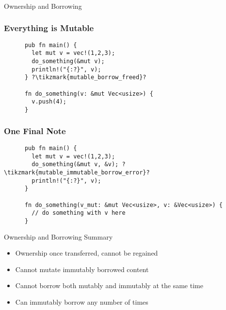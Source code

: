 \begin{section}{Ownership and Borrowing}
  \begin{frame}[fragile]
    \frametitle{Everything is Mutable}
    \begin{verbatim}
      pub fn main() {
        let mut v = vec!(1,2,3);
        do_something(&mut v);
        println!("{:?}", v);
      } ?\tikzmark{mutable_borrow_freed}?

      fn do_something(v: &mut Vec<usize>) {
        v.push(4);
      }
    \end{verbatim}
  \end{frame}

  \begin{frame}[fragile]
    \frametitle{One Final Note}
    \begin{verbatim}
      pub fn main() {
        let mut v = vec!(1,2,3);
        do_something(&mut v, &v); ?\tikzmark{mutable_immutable_borrow_error}?
        println!("{:?}", v);
      }

      fn do_something(v_mut: &mut Vec<usize>, v: &Vec<usize>) {
        // do something with v here
      }
    \end{verbatim}
  \end{frame}

  \begin{frame}{Ownership and Borrowing Summary}
    \begin{itemize}
    \item Ownership once transferred, cannot be regained
    \item Cannot mutate immutably borrowed content
    \item Cannot borrow both mutably and immutably at the same time
    \item Can immutably borrow any number of times
    \end{itemize}
  \end{frame}

\end{section}
